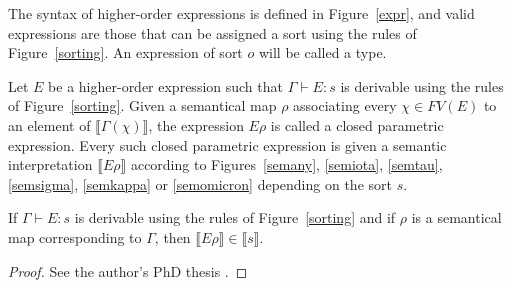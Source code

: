 \begin{definition}
  The syntax of higher-order expressions is defined in Figure~\ref{expr},
  and valid expressions are those that can be assigned a sort using the
  rules of Figure~\ref{sorting}. An expression of sort $o$ will be called
  a type.
\end{definition}

\begin{definition}
  Let $E$ be a higher-order expression such that $\Gamma \vdash E : s$ is
  derivable using the rules of Figure~\ref{sorting}. Given a semantical
  map $\rho$ associating every $\chi \in FV(E)$ to an element of
  $\llbracket \Gamma(\chi) \rrbracket$, the expression $E\rho$ is called
  a closed parametric expression. Every such closed parametric expression is
  given a semantic interpretation $\llbracket E\rho \rrbracket$ according to
  Figures~\ref{semany}, \ref{semiota}, \ref{semtau}, \ref{semsigma},
  \ref{semkappa} or \ref{semomicron} depending on the sort $s$.
\end{definition}

\begin{lemma}
  If $\Gamma \vdash E : s$ is derivable using the rules of
  Figure~\ref{sorting} and if $\rho$ is a semantical map corresponding to
  $\Gamma$, then $\llbracket E\rho \rrbracket \in \llbracket s \rrbracket$.
\end{lemma}
\begin{proof}
  See the author's PhD thesis \cite[Chapter~4]{lepigrePhD}.
\end{proof}

